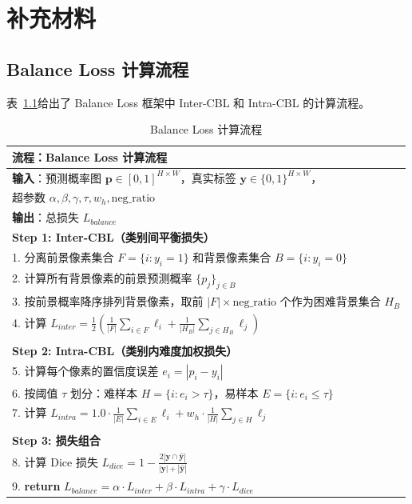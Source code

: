 \chapter{补充材料}

\section{Balance Loss 计算流程}

表~\ref{tab:balance_loss_flow}给出了 Balance Loss 框架中 Inter-CBL 和 Intra-CBL 的计算流程。

\begin{table}[htbp]
\centering
\caption{Balance Loss 计算流程}
\label{tab:balance_loss_flow}
\begin{tabular}{p{}}
\hline
\textbf{流程}：Balance Loss 计算流程 \\
\hline
\textbf{输入}：预测概率图 $\mathbf{p} \in [0,1]^{H \times W}$，真实标签 $\mathbf{y} \in \{0,1\}^{H \times W}$，\\
\quad\quad\quad 超参数 $\alpha, \beta, \gamma, \tau, w_h, \text{neg\_ratio}$ \\
\textbf{输出}：总损失 $L_{balance}$ \\
\hline
\textbf{Step 1: Inter-CBL（类别间平衡损失）} \\
1. 分离前景像素集合 $F = \{i : y_i = 1\}$ 和背景像素集合 $B = \{i : y_i = 0\}$ \\
2. 计算所有背景像素的前景预测概率 $\{p_j\}_{j \in B}$ \\
3. 按前景概率降序排列背景像素，取前 $|F| \times \text{neg\_ratio}$ 个作为困难背景集合 $H_B$ \\
4. 计算 $L_{inter} = \frac{1}{2}\left(\frac{1}{|F|}\sum_{i \in F} \ell_i + \frac{1}{|H_B|}\sum_{j \in H_B} \ell_j\right)$ \\
\\
\textbf{Step 2: Intra-CBL（类别内难度加权损失）} \\
5. 计算每个像素的置信度误差 $e_i = |p_i - y_i|$ \\
6. 按阈值 $\tau$ 划分：难样本 $H = \{i : e_i > \tau\}$，易样本 $E = \{i : e_i \leq \tau\}$ \\
7. 计算 $L_{intra} = 1.0 \cdot \frac{1}{|E|}\sum_{i \in E} \ell_i + w_h \cdot \frac{1}{|H|}\sum_{j \in H} \ell_j$ \\
\\
\textbf{Step 3: 损失组合} \\
8. 计算 Dice 损失 $L_{dice} = 1 - \frac{2|\mathbf{y} \cap \hat{\mathbf{y}}|}{|\mathbf{y}| + |\hat{\mathbf{y}}|}$ \\
9. \textbf{return} $L_{balance} = \alpha \cdot L_{inter} + \beta \cdot L_{intra} + \gamma \cdot L_{dice}$ \\
\hline
\end{tabular}
\end{table}

